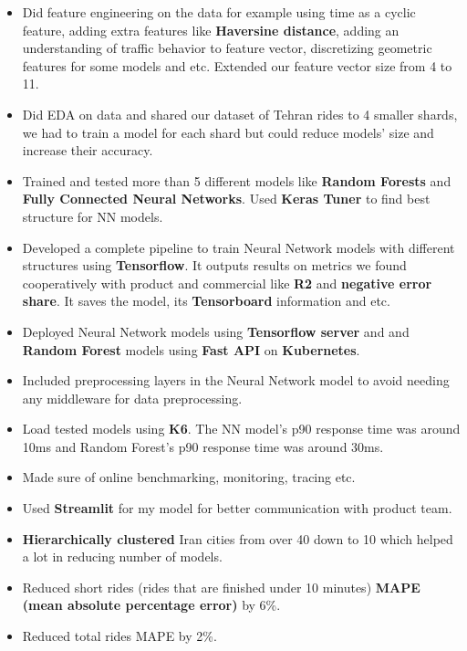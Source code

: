 \begin{itemize}
\begin{itemize}
                  \item Did feature engineering on the data for example using time as a cyclic feature, adding extra features like \textbf{Haversine distance}, adding an understanding of traffic behavior to feature vector, discretizing geometric features for some models and etc. Extended our feature vector size from 4 to 11.
                  \item Did EDA on data and shared our dataset of Tehran rides to 4 smaller shards, we had to train a model for each shard but could reduce models' size and increase their accuracy.
                  \item Trained and tested more than 5 different models like \textbf{Random Forests} and \textbf{Fully Connected Neural Networks}. Used \textbf{Keras Tuner} to find best structure for NN models.
                  \item Developed a complete pipeline to train Neural Network models with different structures using \textbf{Tensorflow}. It outputs results on metrics we found cooperatively with product and commercial like \textbf{R2} and \textbf{negative error share}. It saves the model, its \textbf{Tensorboard} information and etc.
                  \item Deployed Neural Network models using \textbf{Tensorflow server} and and \textbf{Random Forest} models using \textbf{Fast API} on \textbf{Kubernetes}.
                  \item Included preprocessing layers in the Neural Network model to avoid needing any middleware for data preprocessing.
                  \item Load tested models using \textbf{K6}. The NN model's p90 response time was around 10ms and Random Forest's p90 response time was around 30ms.
                  \item Made sure of online benchmarking, monitoring, tracing etc.
                  \item Used \textbf{Streamlit} for my model for better communication with product team.
                  \item \textbf{Hierarchically clustered} Iran cities from over 40 down to 10 which helped a lot in reducing number of models.
                  \item Reduced short rides (rides that are finished under 10 minutes) \textbf{MAPE (mean absolute percentage error)} by 6\%.
                  \item Reduced total rides MAPE by 2\%.
            \end{itemize}

\end{itemize}
